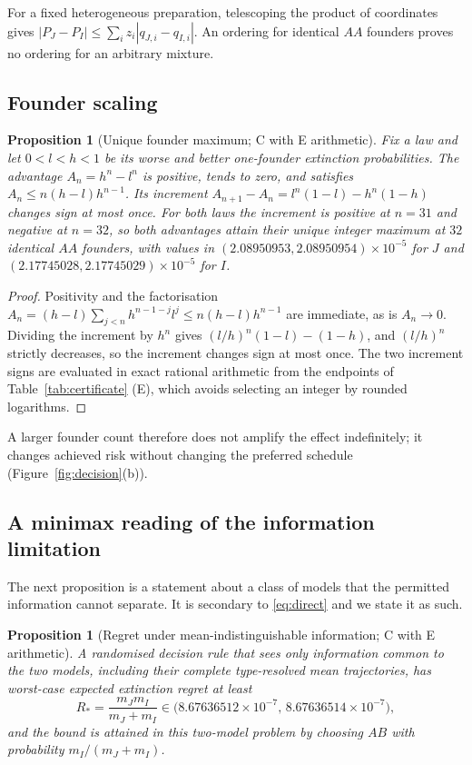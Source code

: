 \documentclass[11pt]{article}
\newtheorem{proposition}[theorem]{Proposition}
\theoremstyle{remark}
\begin{document}
For a fixed heterogeneous preparation, telescoping the product of coordinates
gives $|P_J-P_I|\le\sum_iz_i|q_{J,i}-q_{I,i}|$. An ordering for identical $AA$
founders proves no ordering for an arbitrary mixture.

\subsection{Founder scaling}
\begin{proposition}[Unique founder maximum; C with E arithmetic]\label{prop:founders}
Fix a law and let $0<l<h<1$ be its worse and better one-founder extinction
probabilities. The advantage $A_n=h^n-l^n$ is positive, tends to zero, and
satisfies $A_n\le n(h-l)h^{n-1}$. Its increment $A_{n+1}-A_n=l^n(1-l)-h^n(1-h)$
changes sign at most once. For both laws the increment is positive at $n=31$ and
negative at $n=32$, so both advantages attain their unique integer maximum at
$32$ identical $AA$ founders, with values in
$(2.08950953,2.08950954)\times10^{-5}$ for $J$ and
$(2.17745028,2.17745029)\times10^{-5}$ for $I$.
\end{proposition}

\begin{proof}
Positivity and the factorisation $A_n=(h-l)\sum_{j<n}h^{n-1-j}l^j\le n(h-l)h^{n-1}$
are immediate, as is $A_n\to0$. Dividing the increment by $h^n$ gives
$(l/h)^n(1-l)-(1-h)$, and $(l/h)^n$ strictly decreases, so the increment changes
sign at most once. The two increment signs are evaluated in exact rational
arithmetic from the endpoints of Table~\ref{tab:certificate} \textup{(E)}, which
avoids selecting an integer by rounded logarithms.
\end{proof}

A larger founder count therefore does not amplify the effect indefinitely; it
changes achieved risk without changing the preferred schedule
(Figure~\ref{fig:decision}(b)).

\subsection{A minimax reading of the information limitation}
The next proposition is a statement about a class of models that the permitted
information cannot separate. It is secondary to \eqref{eq:direct} and we state it
as such.

\begin{proposition}[Regret under mean-indistinguishable information; C with E arithmetic]
\label{prop:regret}
A randomised decision rule that sees only information common to the two models,
including their complete type-resolved mean trajectories, has worst-case expected
extinction regret at least
\[
 R_*=\frac{m_Jm_I}{m_J+m_I}\in
 \bigl(8.67636512\times10^{-7},\,8.67636514\times10^{-7}\bigr),
\]
and the bound is attained in this two-model problem by choosing $AB$ with
probability $m_I/(m_J+m_I)$.
\end{proposition}
\end{document}
